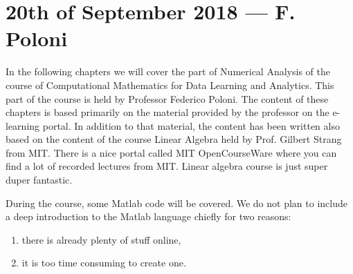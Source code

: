 \documentclass[computationalMathematics.tex]{subfiles}
\begin{document}
\chapter{20th of September 2018 --- F. Poloni}

\par In the following chapters we will cover the part of Numerical Analysis of the course of Computational Mathematics for Data Learning and Analytics. This part of the course is held by Professor Federico Poloni. The content of these chapters is based primarily on the material provided by the professor on the e-learning portal. In addition to that material, the content has been written also based on the content of the course Linear Algebra held by Prof. Gilbert Strang from MIT. There is a nice portal called MIT OpenCourseWare where you can find a lot of recorded lectures from MIT. Linear algebra course is just super duper fantastic.
\par During the course, some Matlab code will be covered. We do not plan to include a deep introduction to the Matlab language chiefly for two reasons:
\begin{enumerate}
    \item there is already plenty of stuff online,
    \item it is too time consuming to create one.
\end{enumerate}
\end{document}
